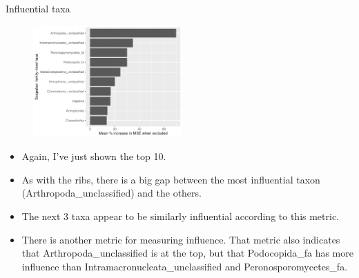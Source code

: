 \documentclass{beamer}
\begin{document}
\begin{frame}{Influential taxa}

  \begin{center}
    \begin{figure}
      \includegraphics[width=2.25in]{w_scapulae/families_scapula_PercIncMSE_barchart}
    \end{figure}
  \end{center}

  \vspace{0.05in}
  
  {\scriptsize
  \begin{itemize}
  \item Again, I've just shown the top 10.
  \item As with the ribs, there is a big gap between the most
    influential taxon (Arthropoda\_unclassified) and the others.
  \item The next 3 taxa appear to be similarly influential according
    to this metric.
  \item There is another metric for measuring influence.  That metric
    also indicates that Arthropoda\_unclassified is at the top, but
    that Podocopida\_fa has more influence than
    Intramacronucleata\_unclassified and Peronosporomycetes\_fa.
  \end{itemize}
  }

\end{frame}
\end{document}

